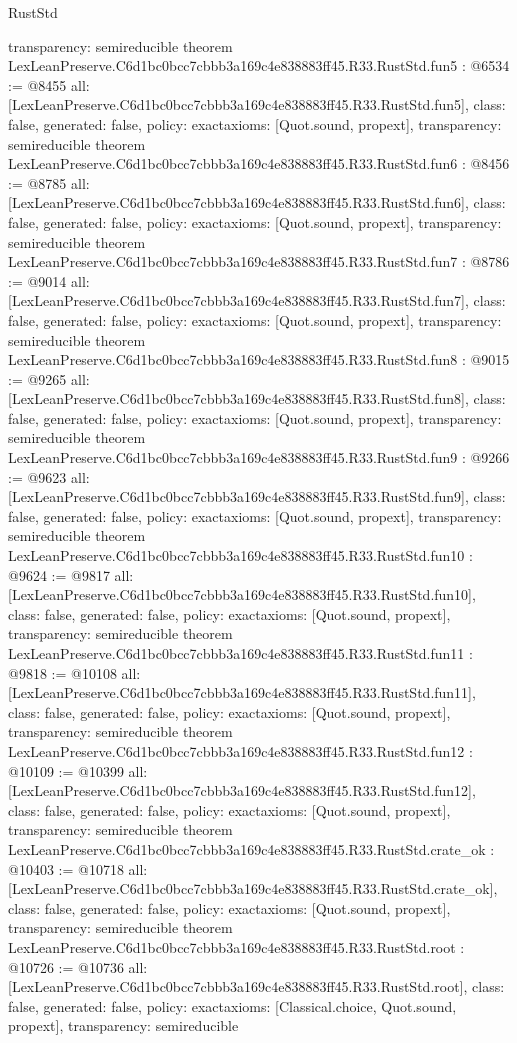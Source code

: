 \begin{lexlean}{RustStd}
\begin{coremodule}
{  transparency: semireducible
}
theorem LexLeanPreserve.C6d1bc0bcc7cbbb3a169c4e838883ff45.R33.RustStd.fun5 : @6534 := @8455 {
  all: [LexLeanPreserve.C6d1bc0bcc7cbbb3a169c4e838883ff45.R33.RustStd.fun5],
  class: false,
  generated: false,
  policy: exact{axioms: [Quot.sound, propext]},
  transparency: semireducible
}
theorem LexLeanPreserve.C6d1bc0bcc7cbbb3a169c4e838883ff45.R33.RustStd.fun6 : @8456 := @8785 {
  all: [LexLeanPreserve.C6d1bc0bcc7cbbb3a169c4e838883ff45.R33.RustStd.fun6],
  class: false,
  generated: false,
  policy: exact{axioms: [Quot.sound, propext]},
  transparency: semireducible
}
theorem LexLeanPreserve.C6d1bc0bcc7cbbb3a169c4e838883ff45.R33.RustStd.fun7 : @8786 := @9014 {
  all: [LexLeanPreserve.C6d1bc0bcc7cbbb3a169c4e838883ff45.R33.RustStd.fun7],
  class: false,
  generated: false,
  policy: exact{axioms: [Quot.sound, propext]},
  transparency: semireducible
}
theorem LexLeanPreserve.C6d1bc0bcc7cbbb3a169c4e838883ff45.R33.RustStd.fun8 : @9015 := @9265 {
  all: [LexLeanPreserve.C6d1bc0bcc7cbbb3a169c4e838883ff45.R33.RustStd.fun8],
  class: false,
  generated: false,
  policy: exact{axioms: [Quot.sound, propext]},
  transparency: semireducible
}
theorem LexLeanPreserve.C6d1bc0bcc7cbbb3a169c4e838883ff45.R33.RustStd.fun9 : @9266 := @9623 {
  all: [LexLeanPreserve.C6d1bc0bcc7cbbb3a169c4e838883ff45.R33.RustStd.fun9],
  class: false,
  generated: false,
  policy: exact{axioms: [Quot.sound, propext]},
  transparency: semireducible
}
theorem LexLeanPreserve.C6d1bc0bcc7cbbb3a169c4e838883ff45.R33.RustStd.fun10 : @9624 := @9817 {
  all: [LexLeanPreserve.C6d1bc0bcc7cbbb3a169c4e838883ff45.R33.RustStd.fun10],
  class: false,
  generated: false,
  policy: exact{axioms: [Quot.sound, propext]},
  transparency: semireducible
}
theorem LexLeanPreserve.C6d1bc0bcc7cbbb3a169c4e838883ff45.R33.RustStd.fun11 : @9818 := @10108 {
  all: [LexLeanPreserve.C6d1bc0bcc7cbbb3a169c4e838883ff45.R33.RustStd.fun11],
  class: false,
  generated: false,
  policy: exact{axioms: [Quot.sound, propext]},
  transparency: semireducible
}
theorem LexLeanPreserve.C6d1bc0bcc7cbbb3a169c4e838883ff45.R33.RustStd.fun12 : @10109 := @10399 {
  all: [LexLeanPreserve.C6d1bc0bcc7cbbb3a169c4e838883ff45.R33.RustStd.fun12],
  class: false,
  generated: false,
  policy: exact{axioms: [Quot.sound, propext]},
  transparency: semireducible
}
theorem LexLeanPreserve.C6d1bc0bcc7cbbb3a169c4e838883ff45.R33.RustStd.crate_ok : @10403 := @10718 {
  all: [LexLeanPreserve.C6d1bc0bcc7cbbb3a169c4e838883ff45.R33.RustStd.crate_ok],
  class: false,
  generated: false,
  policy: exact{axioms: [Quot.sound, propext]},
  transparency: semireducible
}
theorem LexLeanPreserve.C6d1bc0bcc7cbbb3a169c4e838883ff45.R33.RustStd.root : @10726 := @10736 {
  all: [LexLeanPreserve.C6d1bc0bcc7cbbb3a169c4e838883ff45.R33.RustStd.root],
  class: false,
  generated: false,
  policy: exact{axioms: [Classical.choice, Quot.sound, propext]},
  transparency: semireducible
}


\end{coremodule}
\end{lexlean}
